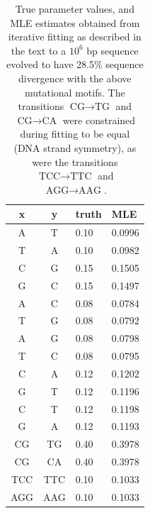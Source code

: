 \documentclass{article}
\newcommand{\nA}{\mbox{A}}  %
\newcommand{\nC}{\mbox{C}}
\newcommand{\nG}{\mbox{G}}
\newcommand{\nT}{\mbox{T}}
\theoremstyle{plain}
\theoremstyle{definition}
\begin{document}
\begin{table}[ht]
  \begin{center}
        \begin{tabular}{c@{\quad$\to$\quad}c@{\quad at rate\quad }ll}
          \hline
            x & y & truth & MLE \\
          \hline
          \nA  &   \nT           & 0.10 & 0.0996 \\
          \nT  &   \nA           & 0.10 & 0.0982 \\
          \nC  &   \nG           & 0.15 & 0.1505 \\
          \nG  &   \nC           & 0.15 & 0.1497 \\
          \nA  &   \nC           & 0.08 & 0.0784 \\
          \nT  &   \nG           & 0.08 & 0.0792 \\
          \nA  &   \nG           & 0.08 & 0.0798 \\
          \nT  &   \nC           & 0.08 & 0.0795 \\
          \nC  &   \nA           & 0.12 & 0.1202 \\
          \nG  &   \nT           & 0.12 & 0.1196 \\
          \nC  &   \nT           & 0.12 & 0.1198 \\
          \nG  &   \nA           & 0.12 & 0.1193 \\
       \nC\nG  &  \nT\nG         & 0.40 & 0.3978 \\
       \nC\nG  &  \nC\nA         & 0.40 & 0.3978 \\
    \nT\nC\nC  &  \nT\nT\nC      & 0.10 & 0.1033 \\
    \nA\nG\nG  &  \nA\nA\nG      & 0.10 & 0.1033 \\
           \hline
        \end{tabular}
  \end{center}
  \caption{
      True parameter values, and MLE estimates obtained
      from iterative fitting as described in the text to a $10^6$ bp sequence
    evolved to have 28.5\% sequence divergence
    with the above mutational motifs. The transitions $\nC\nG \to \nT\nG$ and $\nC\nG \to \nC\nA$
    were constrained during fitting to be equal (DNA strand symmetry),
    as were the transitions $\nT\nC\nC \to \nT\nT\nC$ and $\nA\nG\nG \to \nA\nA\nG$.
    \label{tab:cpg_results} }
\end{table}
\end{document}
